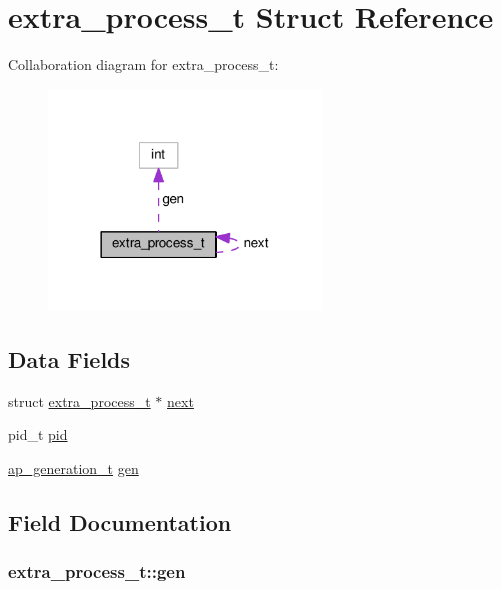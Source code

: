 \hypertarget{structextra__process__t}{}\section{extra\+\_\+process\+\_\+t Struct Reference}
\label{structextra__process__t}


Collaboration diagram for extra\+\_\+process\+\_\+t\+:
\nopagebreak
\begin{figure}[H]
\begin{center}
\leavevmode
\includegraphics[width=206pt]{structextra__process__t__coll__graph}
\end{center}
\end{figure}
\subsection*{Data Fields}
\begin{DoxyCompactItemize}
\item 
struct \hyperlink{structextra__process__t}{extra\+\_\+process\+\_\+t} $\ast$ \hyperlink{structextra__process__t_a9ab6ede07845f95dd38aed1046f26ae8}{next}
\item 
pid\+\_\+t \hyperlink{structextra__process__t_a25f32fb330757ed1d127e7e5daa40169}{pid}
\item 
\hyperlink{scoreboard_8h_a36af569e52dd926cc530df071af3d939}{ap\+\_\+generation\+\_\+t} \hyperlink{structextra__process__t_a763c426cb088b2a76937cc8c60440385}{gen}
\end{DoxyCompactItemize}


\subsection{Field Documentation}
\subsubsection[{\texorpdfstring{gen}{gen}}]{ extra\+\_\+process\+\_\+t\+::gen}\hypertarget{structextra__process__t_a763c426cb088b2a76937cc8c60440385}{}\label{structextra__process__t_a763c426cb088b2a76937cc8c60440385}
